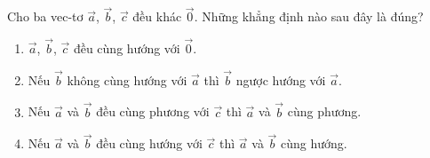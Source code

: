 \begin{bt}%
	Cho ba vec-tơ $ \overrightarrow{a} $, $ \overrightarrow{b} $, $ \overrightarrow{c} $ đều khác $ \overrightarrow{0} $. 
	Những khẳng định nào sau đây là đúng?
	\begin{enumerate}
		\item  $ \overrightarrow{a} $, $ \overrightarrow{b} $, $ \overrightarrow{c} $ đều cùng hướng với $ 
		\overrightarrow{0} $.
		\item Nếu $ \overrightarrow{b} $ không cùng hướng với $ \overrightarrow{a} $ thì $ \overrightarrow{b} $ 
		ngược hướng với $ \overrightarrow{a} $. 
		\item Nếu $ \overrightarrow{a} $ và $ \overrightarrow{b} $ đều cùng phương với $ \overrightarrow{c} $ 
		thì $ \overrightarrow{a} $ và $ \overrightarrow{b} $  cùng phương.
		\item  Nếu $ \overrightarrow{a} $ và $ \overrightarrow{b} $ đều cùng hướng với $ \overrightarrow{c} $ 
		thì $ \overrightarrow{a} $ và $ \overrightarrow{b} $  cùng hướng.
	\end{enumerate}
\end{bt}

